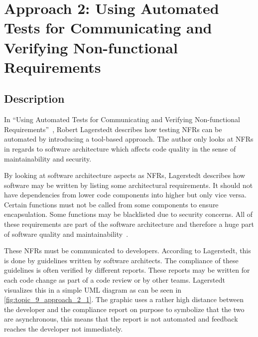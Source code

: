 \newpage

\section{Approach 2: Using Automated Tests for Communicating and Verifying Non-functional Requirements} \label{sec:9_approach_2}

\subsection{Description}

In \enquote{Using Automated Tests for Communicating and Verifying Non-functional Requirements}~\cite{Lagerstedt2014}, Robert Lagerstedt describes how testing NFRs can be automated by introducing a tool-based approach.
The author only looks at NFRs in regards to software architecture which affects code quality in the sense of maintainability and security.

By looking at software architecture aspects as NFRs, Lagerstedt describes how software may be written by listing some architectural requirements.
It should not have dependencies from lower code components into higher but only vice versa.
Certain functions must not be called from some components to ensure encapsulation. Some functions may be blacklisted due to security concerns.
All of these requirements are part of the software architecture and therefore a huge part of software quality and maintainability~\cite{Lagerstedt2014}.

These NFRs must be communicated to developers. According to Lagerstedt, this is done by guidelines written by software architects.
The compliance of these guidelines is often verified by different reports. These reports may be written for each code change as part of a code review or by other teams.
Lagerstedt visualizes this in a simple UML diagram as can be seen in
\autoref{fig:topic_9_approach_2_1}.
The graphic uses a rather high distance between the developer and the compliance report on purpose to symbolize that the two are asynchronous, this means that the report is not automated and feedback reaches the developer not immediately.

